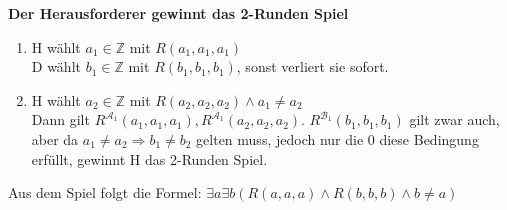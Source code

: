\documentclass[a4paper,10pt]{article}
\newcommand{\Z}{\mathbb{Z}}
\begin{document}
\begin{enumerate}[(i)]
\begin{enumerate}[1. \text{Zug:}]
		\end{enumerate}
	\textbf{Der Herausforderer gewinnt das 2-Runden Spiel}
		\begin{enumerate}[1. \text{Zug:}]
			\item  	H wählt $a_1 \in \mathbb{Z}$ mit $R(a_1,a_1,a_1)$ \\
				D wählt $b_1 \in \Z$ mit $R(b_1,b_1,b_1) $, sonst verliert sie sofort.
			\item  	H wählt $a_2 \in \mathbb{Z}$ mit $R(a_2,a_2,a_2) \land a_1 \neq a_2$ \\
			Dann gilt $R^{\mathcal{A}_1}(a_1,a_1,a_1), R^{\mathcal{A}_1}(a_2,a_2,a_2)$. $R^{\mathcal{B}_1}(b_1,b_1,b_1)$ gilt zwar auch, aber da $a_1 \neq a_2 \Rightarrow b_1 \neq b_2$ gelten muss, jedoch nur die $0$ diese Bedingung erfüllt, gewinnt H das 2-Runden Spiel.

		\end{enumerate}
	Aus dem Spiel folgt die Formel: $\exists a \exists b(R(a,a,a) \land R(b,b,b) \land b \neq a)$

\end{enumerate}
\end{document}
